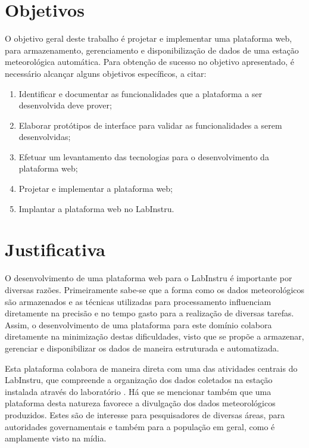 \section{Objetivos}

O objetivo geral deste trabalho é projetar e implementar uma plataforma web, para armazenamento, gerenciamento e disponibilização de dados de uma estação meteorológica automática. Para obtenção de sucesso no objetivo apresentado, é necessário alcançar alguns objetivos específicos, a citar:

\begin{enumerate}
	\item Identificar e documentar as funcionalidades que a plataforma a ser desenvolvida deve prover;
	\item Elaborar protótipos de interface para validar as funcionalidades a serem desenvolvidas;
	\item Efetuar um levantamento das tecnologias para o desenvolvimento da plataforma web;
	\item Projetar e implementar a plataforma web;
	\item Implantar a plataforma web no LabInstru.
\end{enumerate}

\section{Justificativa}

O desenvolvimento de uma plataforma web para o LabInstru é importante por diversas razões. Primeiramente sabe-se que a forma como os dados meteorológicos são armazenados e as técnicas utilizadas para processamento influenciam diretamente na precisão e no tempo gasto para a realização de diversas tarefas. Assim, o desenvolvimento de uma plataforma para este domínio colabora diretamente na minimização destas dificuldades, visto que se propõe a  armazenar, gerenciar e disponibilizar os dados de maneira estruturada e automatizada.

Esta plataforma colabora de maneira direta com uma das atividades centrais do LabInstru, que compreende a organização dos dados coletados na estação instalada através do laboratório \cite{Labinstru:EST}. Há que se mencionar também que uma plataforma desta natureza favorece a divulgação dos dados meteorológicos produzidos. Estes são de interesse para pesquisadores de diversas áreas, para autoridades governamentais e também para a população em geral, como é amplamente visto na mídia.

